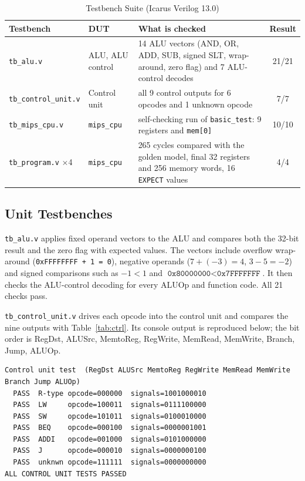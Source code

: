 \documentclass[conference]{IEEEtran}
\begin{document}
\begin{table}[t]
\caption{Testbench Suite (Icarus Verilog 13.0)}
\label{tab:tbs}
\centering\footnotesize\setlength{\tabcolsep}{3pt}
\begin{tabular}{@{}p{2.0cm}p{1.6cm}p{3.15cm}c@{}}
\toprule
Testbench & DUT & What is checked & Result\\
\midrule
\texttt{tb\_alu.v} & ALU, ALU control & 14 ALU vectors (AND, OR, ADD, SUB, signed SLT, wrap-around, zero flag) and 7 ALU-control decodes & 21/21\\
\texttt{tb\_control\_}\allowbreak\texttt{unit.v} & Control unit & all 9 control outputs for 6 opcodes and 1 unknown opcode & 7/7\\
\texttt{tb\_mips\_cpu.v} & \texttt{mips\_cpu} & self-checking run of \texttt{basic\_test}: 9 registers and \texttt{mem[0]} & 10/10\\
\texttt{tb\_program.v} $\times$4 & \texttt{mips\_cpu} & 265 cycles compared with the golden model, final 32 registers and 256 memory words, 16 \texttt{EXPECT} values & 4/4\\
\bottomrule
\end{tabular}
\end{table}

\subsection{Unit Testbenches}
\texttt{tb\_alu.v} applies fixed operand vectors to the ALU and compares both the 32-bit result and the zero flag with expected values. The vectors include overflow wrap-around (\texttt{0xFFFFFFFF + 1 = 0}), negative operands ($7 + (-3) = 4$, $3-5=-2$) and signed comparisons such as $-1 < 1$ and $\texttt{0x80000000} < \texttt{0x7FFFFFFF}$. It then checks the ALU-control decoding for every ALUOp and function code. All 21 checks pass.

\texttt{tb\_control\_unit.v} drives each opcode into the control unit and compares the nine outputs with Table~\ref{tab:ctrl}. Its console output is reproduced below; the bit order is RegDst, ALUSrc, MemtoReg, RegWrite, MemRead, MemWrite, Branch, Jump, ALUOp.
\begin{lstlisting}
Control unit test  (RegDst ALUSrc MemtoReg RegWrite MemRead MemWrite Branch Jump ALUOp)
  PASS  R-type opcode=000000  signals=1001000010
  PASS  LW     opcode=100011  signals=0111100000
  PASS  SW     opcode=101011  signals=0100010000
  PASS  BEQ    opcode=000100  signals=0000001001
  PASS  ADDI   opcode=001000  signals=0101000000
  PASS  J      opcode=000010  signals=0000000100
  PASS  unknwn opcode=111111  signals=0000000000
ALL CONTROL UNIT TESTS PASSED
\end{lstlisting}
\end{document}
